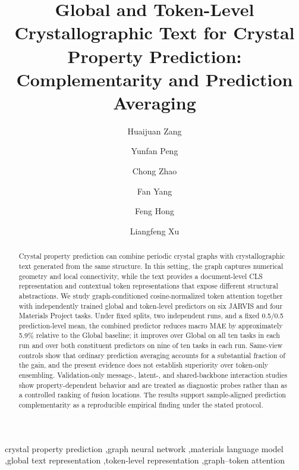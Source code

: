 \documentclass[a4paper,fleqn]{cas-sc}
\begin{document}
\title[mode=title]{Global and Token-Level Crystallographic Text for Crystal Property Prediction: Complementarity and Prediction Averaging}
\author[1]{Huaijuan Zang}
\author[1]{Yunfan Peng}\cormark[1]
\author[2]{Chong Zhao}
\author[1]{Fan Yang}
\author[3]{Feng Hong}
\author[1]{Liangfeng Xu}

\begin{abstract}
Crystal property prediction can combine periodic crystal graphs with crystallographic text generated from the same structure. In this setting, the graph captures numerical geometry and local connectivity, while the text provides a document-level CLS representation and contextual token representations that expose different structural abstractions. We study graph-conditioned cosine-normalized token attention together with independently trained global and token-level predictors on six JARVIS and four Materials Project tasks. Under fixed splits, two independent runs, and a fixed 0.5/0.5 prediction-level mean, the combined predictor reduces macro MAE by approximately 5.9\% relative to the Global baseline; it improves over Global on all ten tasks in each run and over both constituent predictors on nine of ten tasks in each run. Same-view controls show that ordinary prediction averaging accounts for a substantial fraction of the gain, and the present evidence does not establish superiority over token-only ensembling. Validation-only message-, latent-, and shared-backbone interaction studies show property-dependent behavior and are treated as diagnostic probes rather than as a controlled ranking of fusion locations. The results support sample-aligned prediction complementarity as a reproducible empirical finding under the stated protocol.
\end{abstract}
\begin{keywords}crystal property prediction \sep graph neural network \sep materials language model \sep global text representation \sep token-level representation \sep graph--token attention
\end{keywords}
\maketitle
\end{document}
